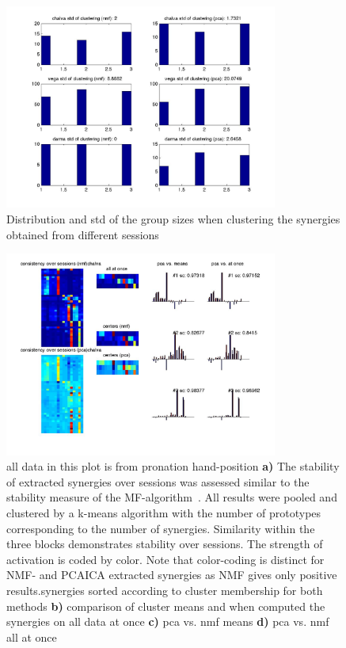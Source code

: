 \begin{figure}[h]
    \centering
    \includegraphics[width=0.8\textwidth]{images/syn_consist_sessions_std.jpg}
    \caption{Distribution and std of the group sizes when clustering the synergies obtained from different sessions}
    \label{sg:fig:images_syn_consist_sessions_std}
\end{figure}


\begin{figure}[h]
    \centering
    \includegraphics[width=0.8\textwidth]{images/syn_consist_sessions_chalva.jpg}
    \caption{
    all data in this plot is from pronation hand-position 
    \textbf{a)} The stability of extracted synergies over sessions was assessed similar to the stability measure of the MF-algorithm~. All results were pooled and clustered by a k-means algorithm with the number of prototypes corresponding to the number of synergies. Similarity within the three blocks demonstrates stability over sessions. The strength of activation is coded by color. Note that color-coding is distinct for NMF- and PCAICA extracted synergies as NMF gives only positive results.synergies sorted according to cluster membership for both methods 
    \textbf{b)} comparison of cluster means and when computed the synergies on all data at once 
    \textbf{c)} pca vs. nmf means 
    \textbf{d)} pca vs. nmf all at once 
    }
    \label{sg:fig:images_syn_consist_sessions_chalva}
\end{figure}


